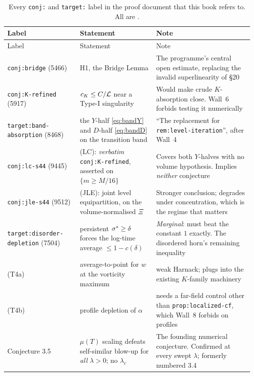 {\footnotesize
\begin{longtable}{@{}>{\raggedright\arraybackslash}p{} >{\raggedright\arraybackslash}p{} >{\raggedright\arraybackslash}p{}@{}}
\caption[Conjectures and open targets]{Every \texttt{conj:} and
\texttt{target:} label in the proof document that this book refers to. All are
\OPEN{}.}
\label{tab:a3-conj}\\
\toprule
Label & Statement & Note \\
\midrule
\endfirsthead
\toprule
Label & Statement & Note \\
\midrule
\endhead
\bottomrule
\endfoot
\texttt{conj:bridge} (5466) & H1, the Bridge Lemma
  & The programme's central open estimate, replacing the invalid
    superlinearity of \S20 \\
\texttt{conj:K-refined} (5917) & \(c_K\le C/\mathcal{L}\) near a Type-I singularity
  & Would make crude \(K\)-absorption close. Wall~6 forbids testing it
    numerically \\
\texttt{target:band-absorption} (8468) & the \(Y\)-half \eqref{eq:bandY} and
  \(D\)-half \eqref{eq:bandD} on the transition band
  & ``The replacement for \texttt{rem:level-iteration}'', after Wall~4 \\
\texttt{conj:lc-s44} (9445) & (LC): \emph{verbatim} \texttt{conj:K-refined},
  asserted on \(\{m\ge M/16\}\)
  & Covers both \(Y\)-halves with no volume hypothesis. Implies
    \emph{neither} conjecture \\
\texttt{conj:jle-s44} (9512) & (JLE): joint level equipartition, on the
  volume-normalised \(\Xi\)
  & Stronger conclusion; degrades under concentration, which is the regime
    that matters \\
\texttt{target:disorder-} \texttt{depletion} (7504)
  & persistent \(\sigma^{*}\ge\delta\) forces the log-time average
    \(\le1-c(\delta)\)
  & \emph{Marginal}: must beat the constant \(1\) exactly. The disordered
    horn's remaining inequality \\
\quad (T4a) & average-to-point for \(w\) at the vorticity maximum
  & weak Harnack; plugs into the existing \(K\)-family machinery \\
\quad (T4b) & profile depletion of \(\alpha\)
  & needs a far-field control other than \texttt{prop:localized-cf}, which
    Wall~8 forbids on profiles \\
Conjecture 3.5 & \(\mu(T)\) scaling defeats self-similar blow-up for
  \emph{all} \(\lambda>0\); no \(\lambda_c\)
  & The founding numerical conjecture. Confirmed at every swept \(\lambda\);
    formerly numbered 3.4 \\
\end{longtable}}

